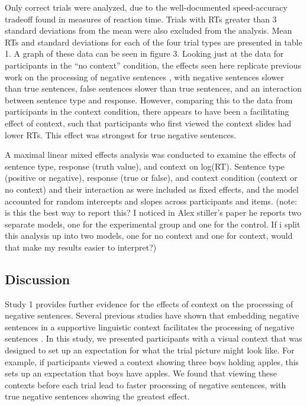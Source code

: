 \documentclass[10pt,letterpaper]{article}
\begin{document}
Only correct trials were analyzed, due to the well-documented speed-accuracy tradeoff found in measures of reaction time.  Trials with RTs greater than 3 standard deviations from the mean were also excluded from the analysis.  Mean RTs and standard deviations for each of the four trial types are presented in table 1.  A graph of these data can be seen in figure 3.  Looking just at the data for participants in the ``no context'' condition, the effects seen here replicate previous work on the processing of negative sentences \cite{hclark1972, carpenter1975, just1971, just1976}, with negative sentences slower than true sentences, false sentences slower than true sentences, and an interaction between sentence type and response.  However, comparing this to the data from participants in the context condition, there appears to have been a facilitating effect of context, such that participants who first viewed the context slides had lower RTs.  This effect was strongest for true negative sentences.  

A maximal linear mixed effects analysis was conducted to examine the effects of sentence type, response (truth value), and context on log(RT).  Sentence type (positive or negative), response (true or false), and context condition (context or no context) and their interaction as were included as fixed effects, and the model accounted for random intercepts and slopes across participants and items.  (note: is this the best way to report this?  I noticed in Alex stiller's paper he reports two separate models, one for the experimental group and one for the control.  If i split this analysis up into two models, one for no context and one for context, would that make my results easier to interpret?)

\subsection{Discussion}

Study 1 provides further evidence for the effects of context on the processing of negative sentences.  Several previous studies have shown that embedding negative sentences in a supportive linguistic context facilitates the processing of negative sentences \cite{dale2011, glenberg1999, ludtke2006}.  In this study, we presented participants with a visual context that was designed to set up an expectation for what the trial picture might look like.  For example, if participants viewed a context showing three boys holding apples, this sets up an expectation that boys have apples.  We found that viewing these contexts before each trial lead to faster processing of negative sentences, with true negative sentences showing the greatest effect.  
\end{document}
